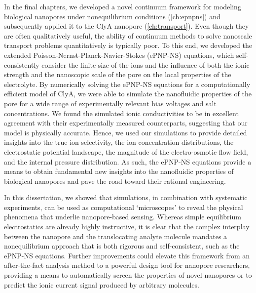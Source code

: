 In the final chapters, we developed a novel continuum framework for modeling biological nanopores under
nonequilibrium conditions (\cref{ch:epnpns}) and subsequently applied it to the ClyA nanopore
(\cref{ch:transport}). Even though they are often qualitatively useful, the ability of continuum methods to
solve nanoscale transport problems quantitatively is typically poor. To this end, we developed the
extended Poisson-Nernst-Planck-Navier-Stokes ({ePNP-NS}) equations, which self-consistently consider the
finite size of the ions and the influence of both the ionic strength and the nanoscopic scale of the pore on
the local properties of the electrolyte. By numerically solving the {ePNP-NS} equations for a computationally
efficient model of ClyA, we were able to simulate the nanofluidic properties of the pore for a wide range of
experimentally relevant bias voltages and salt concentrations. We found the simulated ionic conductivities to
be in excellent agreement with their experimentally measured counterparts, suggesting that our model is
physically accurate. Hence, we used our simulations to provide detailed insights into the true ion
selectivity, the ion concentration distributions, the electrostatic potential landscape, the magnitude of the
electro-osmotic flow field, and the internal pressure distribution. As such, the {ePNP-NS} equations provide a
means to obtain fundamental new insights into the nanofluidic properties of biological nanopores and pave the
road toward their rational engineering.

In this dissertation, we showed that simulations, in combination with systematic experiments, can be used as
computational `microscopes' to reveal the physical phenomena that underlie nanopore-based sensing. Whereas
simple equilibrium electrostatics are already highly instructive, it is clear that the complex interplay
between the nanopore and the translocating analyte molecule mandates a nonequilibrium approach that is both
rigorous and self-consistent, such as the {ePNP-NS} equations. Further improvements could elevate this
framework from an after-the-fact analysis method to a powerful design tool for nanopore researchers, providing
a means to automatically screen the properties of novel nanopores or to predict the ionic current signal
produced by arbitrary molecules.


\cleardoublepage

